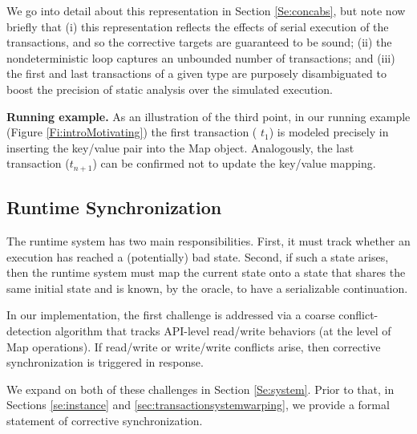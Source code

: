 We go into detail about this representation in Section \ref{Se:concabs}, but note now briefly that (i) this representation reflects the effects of serial execution of the transactions, and so the corrective targets are guaranteed to be sound; (ii) the nondeterministic loop captures an unbounded number of transactions; and (iii) the first and last transactions of a given type are purposely disambiguated to boost the precision of static analysis over the simulated execution.

\noindent \textbf{Running example.} As an illustration of the third point, in our running example (Figure \ref{Fi:introMotivating}) the first transaction ( $t_1$) is modeled precisely in inserting the key/value pair into the {\sf Map} object. Analogously, the last transaction ($t_{n+1}$) can be confirmed not to update the key/value mapping.

\subsection{Runtime Synchronization} 

The runtime system has two main responsibilities. First, it must track whether an execution has reached a (potentially) bad state. Second, if such a state arises, then the runtime system must map the current state onto a state that shares the same initial state and is known, by the oracle, to have a serializable continuation. 

In our implementation, the first challenge is addressed via a coarse conflict-detection algorithm that tracks API-level read/write behaviors (at the level of {\sf Map} operations). If read/write or write/write conflicts arise, then corrective synchronization is triggered in response. 


We expand on both of these challenges in Section \ref{Se:system}. Prior to that, in Sections \ref{se:instance} and \ref{sec:transactionsystemwarping}, we provide a formal statement of corrective synchronization.


